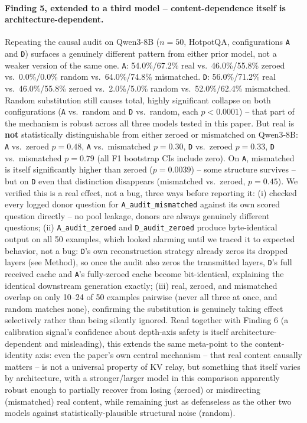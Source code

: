 \documentclass[11pt]{article}
\begin{document}
\paragraph{Finding 5, extended to a third model -- content-dependence
itself is architecture-dependent.} Repeating the causal audit on
Qwen3-8B ($n=50$, HotpotQA, configurations \texttt{A} and \texttt{D})
surfaces a genuinely different pattern from either prior model, not a
weaker version of the same one. \texttt{A}: 54.0\%/67.2\% real vs.\
46.0\%/55.8\% zeroed vs.\ 0.0\%/0.0\% random vs.\ 64.0\%/74.8\%
mismatched. \texttt{D}: 56.0\%/71.2\% real vs.\ 46.0\%/55.8\% zeroed
vs.\ 2.0\%/5.0\% random vs.\ 52.0\%/62.4\% mismatched. Random
substitution still causes total, highly significant collapse on both
configurations (\texttt{A} vs.\ random and \texttt{D} vs.\ random, each
$p<0.0001$) -- that part of the mechanism is robust across all three
models tested in this paper. But real is \textbf{not} statistically
distinguishable from either zeroed or mismatched on Qwen3-8B:
\texttt{A} vs.\ zeroed $p=0.48$, \texttt{A} vs.\ mismatched $p=0.30$,
\texttt{D} vs.\ zeroed $p=0.33$, \texttt{D} vs.\ mismatched $p=0.79$
(all F1 bootstrap CIs include zero). On \texttt{A}, mismatched is
itself significantly higher than zeroed ($p=0.0039$) -- some structure
survives -- but on \texttt{D} even that distinction disappears
(mismatched vs.\ zeroed, $p=0.45$). We verified this is a real effect,
not a bug, three ways before reporting it: (i) checked every logged
donor question for \texttt{A\_audit\_mismatched} against its own scored
question directly -- no pool leakage, donors are always genuinely
different questions; (ii) \texttt{A\_audit\_zeroed} and
\texttt{D\_audit\_zeroed} produce byte-identical output on all 50
examples, which looked alarming until we traced it to expected
behavior, not a bug: \texttt{D}'s own reconstruction strategy already
zeros its dropped layers (see Method), so once the audit also zeros
the transmitted layers, \texttt{D}'s full received cache and
\texttt{A}'s fully-zeroed cache become bit-identical, explaining the
identical downstream generation exactly; (iii) real, zeroed, and
mismatched overlap on only 10--24 of 50 examples pairwise (never all
three at once, and random matches none), confirming the substitution
is genuinely taking effect selectively rather than being silently
ignored. Read together with Finding 6 (a calibration signal's
confidence about depth-axis safety is itself architecture-dependent
and misleading), this extends the same meta-point to the
content-identity axis: even the paper's own central mechanism -- that
real content causally matters -- is not a universal property of KV
relay, but something that itself varies by architecture, with a
stronger/larger model in this comparison apparently robust enough to
partially recover from losing (zeroed) or misdirecting (mismatched)
real content, while remaining just as defenseless as the other two
models against statistically-plausible structural noise (random).
\end{document}
